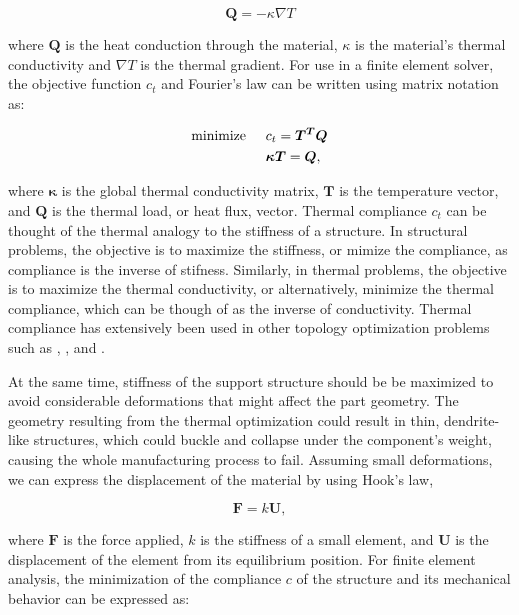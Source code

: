 \documentclass[../main.tex]{subfiles}
\begin{document}
\begin{equation}
  \label{eq:Fourier Law}
  \bm{Q} = -\kappa \nabla T
\end{equation}

where $\bm{Q}$ is the heat conduction through the material, $\kappa$ is the material's thermal conductivity and $\nabla T$ is the thermal gradient. For use in a finite element solver, the objective function $c_t$ and Fourier's law can be written using matrix notation as:

\begin{align}
  \text{minimize} \hspace{0.5cm} & c_t = \bm{T^T} \bm{Q} \\
           & \bm{\kappa}\bm{T}  = \bm{Q},
\end{align}

where $\bm{\kappa}$ is the global thermal conductivity matrix, $\bm{T}$ is the temperature vector, and $\bm{Q}$ is the thermal load, or heat flux, vector. Thermal compliance $c_t$ can be thought of the thermal analogy to the stiffness of a structure. In structural problems, the objective is to maximize the stiffness, or mimize the compliance, as compliance is the inverse of stifness. Similarly, in thermal problems, the objective is to maximize the thermal conductivity, or alternatively, minimize the thermal compliance, which can be though of as the inverse of conductivity. Thermal compliance has extensively been used in other topology optimization problems such as \cite{leeObjectiveFunctionTopology2021}, \cite{yoonTopologicalDesignHeat2010}, and \cite{brunsTopologyOptimizationConvectiondominated2007}.

At the same time, stiffness of the support structure should be be maximized to avoid considerable deformations that might affect the part geometry. The geometry resulting from the thermal optimization could result in thin, dendrite-like structures, which could buckle and collapse under the component's weight, causing the whole manufacturing process to fail. Assuming small deformations, we can express the displacement of the material by using Hook's law,

\begin{equation}
  \bm{F} = k\bm{U},
\end{equation}

where $\bm{F}$ is the force applied, $k$ is the stiffness of a small element, and $\bm{U}$ is the displacement of the element from its equilibrium position. For finite element analysis, the minimization of the compliance $c$ of the structure and its mechanical behavior can be expressed as:
\end{document}
